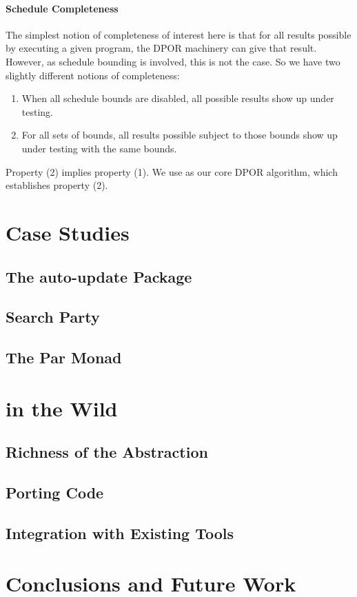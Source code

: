 \paragraph{Schedule Completeness}
The simplest notion of completeness of interest here is that for all
results possible by executing a given program, the DPOR machinery can
give that result.  However, as schedule bounding is involved, this is
not the case.  So we have two slightly different notions of
completeness:

\begin{enumerate}
\item When all schedule bounds are disabled, all possible results show
  up under testing.
\item For all sets of bounds, all results possible subject to those
  bounds show up under testing with the same bounds.
\end{enumerate}

Property (2) implies property (1).  We use \cite{coons2013} as our
core DPOR algorithm, which establishes property (2).

\section{Case Studies}
\label{sec:dejafu-casestudies}

\blindtext

\subsection{The auto-update Package}
\subsection{Search Party}
\subsection{The Par Monad}

\section{\dejafu{} in the Wild}
\label{sec:dejafu-evaluation}

\blindtext

\subsection{Richness of the Abstraction}
\subsection{Porting Code}
\subsection{Integration with Existing Tools}

\section{Conclusions and Future Work}
\label{sec:dejafu-conclusions}

\blindtext
